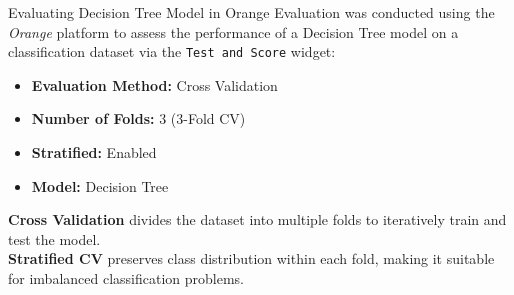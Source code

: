 \documentclass[aspectratio=169, table]{beamer}
\begin{document}
\begin{frame}{Evaluating Decision Tree Model in Orange}
	\vspace{5pt}
	Evaluation was conducted using the \textit{Orange} platform to assess the performance of a Decision Tree model on a classification dataset via the \texttt{Test and Score} widget:
	
	\begin{itemize}
		\item \textbf{Evaluation Method:} Cross Validation
		\item \textbf{Number of Folds:} 3 (3-Fold CV)
		\item \textbf{Stratified:} Enabled
		\item \textbf{Model:} Decision Tree
	\end{itemize}
	
	\textbf{Cross Validation} divides the dataset into multiple folds to iteratively train and test the model.\\
	  
	\textbf{Stratified CV} preserves class distribution within each fold, making it suitable for imbalanced classification problems.
\end{frame}
\end{document}
